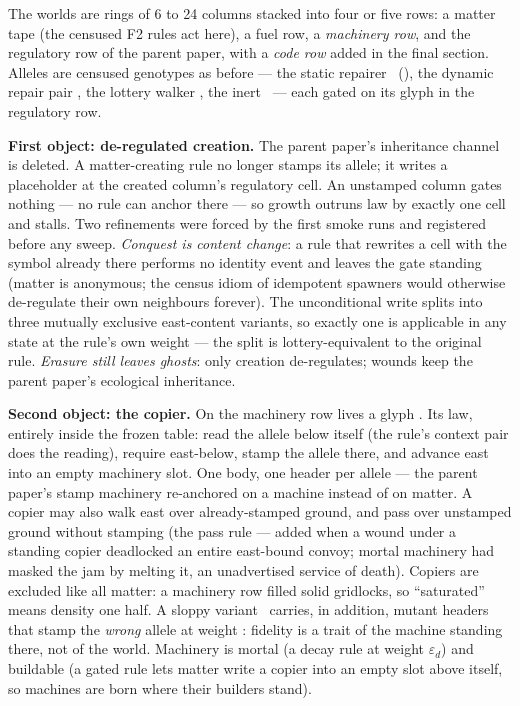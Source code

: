 The worlds are rings of 6 to 24 columns stacked into four or five
rows: a matter tape (the censused F2 rules act here), a fuel row,
a {\it machinery row}, and the regulatory row of the parent paper,
with a {\it code row} added in the final section. Alleles are
censused genotypes as before --- the static repairer \la\
(), the dynamic repair pair \lb, the lottery
walker \lc, the inert \ld\ --- each gated on its glyph in the
regulatory row.

{\bf First object: de-regulated creation.} The parent paper's
inheritance channel is deleted. A matter-creating rule no longer
stamps its allele; it writes a placeholder \g{?} at the created
column's regulatory cell. An unstamped column gates nothing ---
no rule can anchor there --- so growth outruns law by exactly one
cell and stalls. Two refinements were forced by the first smoke
runs and registered before any sweep. {\it Conquest is content
change}: a rule that rewrites a cell with the symbol already there
performs no identity event and leaves the gate standing (matter is
anonymous; the census idiom of idempotent spawners would otherwise
de-regulate their own neighbours forever). The unconditional write
splits into three mutually exclusive east-content variants, so
exactly one is applicable in any state at the rule's own weight
--- the split is lottery-equivalent to the original rule.
{\it Erasure still leaves ghosts}: only creation de-regulates;
wounds keep the parent paper's ecological inheritance.

{\bf Second object: the copier.} On the machinery row lives a
glyph \Pc. Its law, entirely inside the frozen table: read the
allele below itself (the rule's context pair does the reading),
require  east-below, stamp the allele there, and advance
east into an empty machinery slot. One body, one header per
allele --- the parent paper's stamp machinery re-anchored on a
machine instead of on matter. A copier may also walk east over
already-stamped ground, and pass over unstamped ground without
stamping (the pass rule --- added when a wound under a standing
copier deadlocked an entire east-bound convoy; mortal machinery
had masked the jam by melting it, an unadvertised service of
death). Copiers are excluded like all matter: a machinery row
filled solid gridlocks, so “saturated” means density one half. A
sloppy variant \pc\ carries, in addition, mutant headers that
stamp the {\it wrong} allele at weight \eps: fidelity is a trait
of the machine standing there, not of the world. Machinery is
mortal (a decay rule at weight $\varepsilon_d$) and buildable (a
gated rule lets matter write a copier into an empty slot above
itself, so machines are born where their builders stand).

